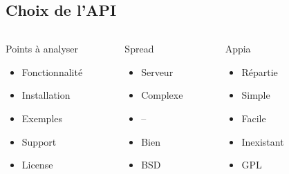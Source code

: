 \documentclass{beamer}
\begin{document}
\subsection{Choix de l'API}

\begin{frame}
  \begin{columns}[t]
    \begin{column}{3.2cm}
      \begin{block}{Points à analyser}
        \begin{itemize}
          \item Fonctionnalité
          \item Installation
          \item Exemples
          \item Support
          \item License
        \end{itemize}
      \end{block}
    \end{column}
    \begin{column}{2.6cm}
      \begin{alertblock}{Spread}
        \begin{itemize}
          \item Serveur
          \item Complexe
          \item --
          \item Bien
          \item BSD
        \end{itemize}
      \end{alertblock}
    \end{column}
    \begin{column}{2.6cm}
      \begin{alertblock}{Appia}
        \begin{itemize}
          \item Répartie
          \item Simple
          \item Facile
          \item Inexistant
          \item GPL
        \end{itemize}
      \end{alertblock}
    \end{column}
    \begin{column}{2.6cm}

\end{column}
\end{columns}
\end{frame}
\end{document}
